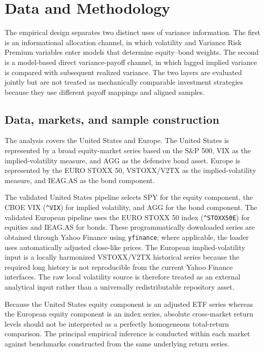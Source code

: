 \section{Data and Methodology}
\label{sec:methodology}

The empirical design separates two distinct uses of variance information. The first is an informational allocation channel, in which volatility and Variance Risk Premium variables enter models that determine equity--bond weights. The second is a model-based direct variance-payoff channel, in which lagged implied variance is compared with subsequent realized variance. The two layers are evaluated jointly but are not treated as mechanically comparable investment strategies because they use different payoff mappings and aligned samples.

\subsection{Data, markets, and sample construction}

The analysis covers the United States and Europe. The United States is represented by a broad equity-market series based on the S\&P 500, VIX as the implied-volatility measure, and AGG as the defensive bond asset. Europe is represented by the EURO STOXX 50, VSTOXX/V2TX as the implied-volatility measure, and IEAG.AS as the bond component.

The validated United States pipeline selects SPY for the equity
component, the CBOE VIX (\texttt{\^{}VIX}) for implied volatility,
and AGG for the bond component. The validated European pipeline uses
the EURO STOXX 50 index (\texttt{\^{}STOXX50E}) for equities and
IEAG.AS for bonds. These programmatically downloaded series are
obtained through Yahoo Finance using \texttt{yfinance}; where
applicable, the loader uses automatically adjusted close-like prices.
The European implied-volatility input is a locally harmonized
VSTOXX/V2TX historical series because the required long history is
not reproducible from the current Yahoo Finance interfaces. The raw
local volatility source is therefore treated as an external analytical
input rather than a universally redistributable repository asset.

Because the United States equity component is an adjusted ETF series
whereas the European equity component is an index series, absolute
cross-market return levels should not be interpreted as a perfectly
homogeneous total-return comparison. The principal empirical
inference is conducted within each market against benchmarks
constructed from the same underlying return series.


